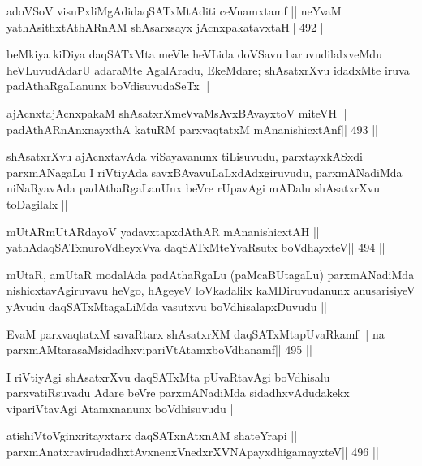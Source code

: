 \begin{shl}
adoVSoV visuPxliMgAdidaqSATxMtAditi ceVnamxtamf ||
neYvaM yathAsithxtAthARnAM shAsarxsayx jAcnxpakatavxtaH\hfill || 492 ||
\end{shl}

\begin{artha}
beMkiya kiDiya daqSATxMta meVle heVLida doVSavu baruvudilalxveMdu
heVLuvudAdarU adaraMte AgalAradu, EkeMdare; shAsatxrXvu idadxMte iruva
padAthaRgaLanunx boVdisuvudaSeTx ||
\end{artha}



\begin{shl}
ajAcnxtajAcnxpakaM shAsatxrXmeVvaMsAvxBAvayxtoV miteVH ||
padAthARnAnxnayxthA katuRM parxvaqtatxM mAnanishicxtAnf\hfill || 493 ||
\end{shl}

\begin{artha}
shAsatxrXvu ajAcnxtavAda viSayavanunx tiLisuvudu, parxtayxkASxdi
parxmANagaLu I riVtiyAda savxBAvavuLaLxdAdxgiruvudu, parxmANadiMda
niNaRyavAda padAthaRgaLanUnx beVre rUpavAgi mADalu shAsatxrXvu
toDagilalx ||
\end{artha}

\begin{shl}
mUtARmUtARdayoV yadavxtapxdAthAR mAnanishicxtAH ||
yathAdaqSATxnuroVdheyxVva daqSATxMteYvaRsutx boVdhayxteV\hfill || 494 ||
\end{shl}

\begin{artha}
mUtaR, amUtaR modalAda padAthaRgaLu (paMcaBUtagaLu) parxmANadiMda
nishicxtavAgiruvavu heVgo, hAgeyeV loVkadalilx kaMDiruvudanunx
anusarisiyeV yAvudu daqSATxMtagaLiMda vasutxvu boVdhisalapxDuvudu ||
\end{artha}

\begin{shl}
EvaM parxvaqtatxM savaRtarx shAsatxrXM daqSATxMtapUvaRkamf ||
na parxmAMtarasaMsidadhxvipariVtAtamxboVdhanamf\hfill || 495 ||
\end{shl}

\begin{artha}
I riVtiyAgi shAsatxrXvu daqSATxMta pUvaRtavAgi boVdhisalu
parxvatiRsuvadu Adare beVre parxmANadiMda sidadhxvAdudakekx
vipariVtavAgi Atamxnanunx boVdhisuvudu |
\end{artha}

\begin{shl}
atishiVtoV\s ginxritayxtarx daqSATxnAtxnAM shateYrapi ||
parxmAnatxravirudadhxtAvxnenxVnedxrXVNApayxdhigamayxteV\hfill || 496 ||
\end{shl}

